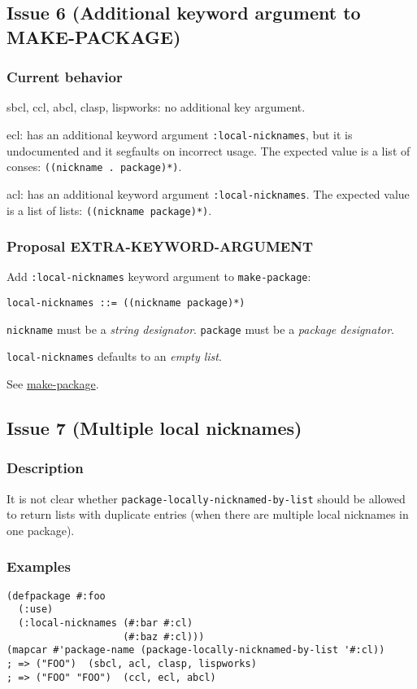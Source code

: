 \documentclass[11pt]{article}
\begin{document}
\subsection{Issue 6 (Additional keyword argument to MAKE-PACKAGE)}
\label{sec:orgb88c64d}
\subsubsection{Current behavior}
\label{sec:org6f4df09}
sbcl, ccl, abcl, clasp, lispworks: no additional key argument.

ecl: has an additional keyword argument \texttt{:local-nicknames}, but it is undocumented
and it segfaults on incorrect usage. The expected value is a list of conses:
\texttt{((nickname . package)*)}.

acl: has an additional keyword argument \texttt{:local-nicknames}. The expected value is
a list of lists: \texttt{((nickname package)*)}.
\subsubsection{Proposal EXTRA-KEYWORD-ARGUMENT}
\label{sec:org899962d}
Add \texttt{:local-nicknames} keyword argument to \texttt{make-package}:
\begin{verbatim}
local-nicknames ::= ((nickname package)*)
\end{verbatim}

\texttt{nickname} must be a \emph{string designator}.
\texttt{package} must be a \emph{package designator}.

\texttt{local-nicknames} defaults to an \emph{empty list}.

See \hyperref[sec:org64e8231]{make-package}.
\subsection{Issue 7 (Multiple local nicknames)}
\label{sec:org9e1ceeb}
\subsubsection{Description}
\label{sec:org1ff27d7}
It is not clear whether \texttt{package-locally-nicknamed-by-list} should be allowed to return
lists with duplicate entries (when there are multiple local nicknames in one package).
\subsubsection{Examples}
\label{sec:orgc87a399}
\begin{verbatim}
(defpackage #:foo
  (:use)
  (:local-nicknames (#:bar #:cl)
                    (#:baz #:cl)))
(mapcar #'package-name (package-locally-nicknamed-by-list '#:cl))
; => ("FOO")  (sbcl, acl, clasp, lispworks)
; => ("FOO" "FOO")  (ccl, ecl, abcl)
\end{verbatim}
\end{document}
